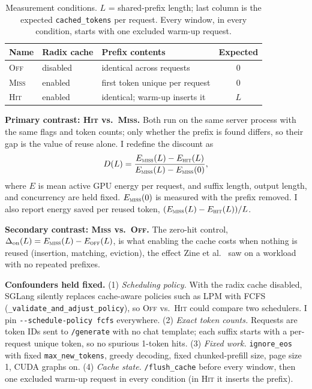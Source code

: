 \documentclass[conference]{IEEEtran}
\begin{document}
\begin{table}[!h]
\caption{Measurement conditions. $L$ = shared-prefix length; last column is the expected \texttt{cached\_tokens} per request. Every window, in every condition, starts with one excluded warm-up request.}
\label{tab:cond}
\centering
\footnotesize
\begin{tabular}{@{}lllc@{}}
\toprule
Name & Radix cache & Prefix contents & Expected \\
\midrule
\textsc{Off}  & disabled & identical across requests & 0 \\
\textsc{Miss} & enabled  & first token unique per request & 0 \\
\textsc{Hit}  & enabled  & identical; warm-up inserts it & $L$ \\
\bottomrule
\end{tabular}
\end{table}

\textbf{Primary contrast: \textsc{Hit} vs.\ \textsc{Miss}.} Both run on the same server process with the same flags and token counts; only whether the prefix is found differs, so their gap is the value of reuse alone. I redefine the discount as
\begin{equation}
D(L) = \frac{E_{\textsc{miss}}(L) - E_{\textsc{hit}}(L)}{E_{\textsc{miss}}(L) - E_{\textsc{miss}}(0)},
\label{eq:d}
\end{equation}
where $E$ is mean active GPU energy per request, and suffix length, output length, and concurrency are held fixed. $E_{\textsc{miss}}(0)$ is measured with the prefix removed. I also report energy saved per reused token, $(E_{\textsc{miss}}(L)-E_{\textsc{hit}}(L))/L$.

\textbf{Secondary contrast: \textsc{Miss} vs.\ \textsc{Off}.} The zero-hit control, $\Delta_{\text{on}}(L)=E_{\textsc{miss}}(L)-E_{\textsc{off}}(L)$, is what enabling the cache costs when nothing is reused (insertion, matching, eviction), the effect Zine et al.~\cite{zine} saw on a workload with no repeated prefixes.

\textbf{Confounders held fixed.} (1) \emph{Scheduling policy.} With the radix cache disabled, SGLang silently replaces cache-aware policies such as LPM with FCFS (\texttt{\_validate\_and\_adjust\_policy}), so \textsc{Off} vs.\ \textsc{Hit} could compare two schedulers. I pin \texttt{-{}-schedule-policy fcfs} everywhere. (2) \emph{Exact token counts.} Requests are token IDs sent to \texttt{/generate} with no chat template; each suffix starts with a per-request unique token, so no spurious 1-token hits. (3) \emph{Fixed work.} \texttt{ignore\_eos} with fixed \texttt{max\_new\_tokens}, greedy decoding, fixed chunked-prefill size, page size 1, CUDA graphs on. (4) \emph{Cache state.} \texttt{/flush\_cache} before every window, then one excluded warm-up request in every condition (in \textsc{Hit} it inserts the prefix).
\end{document}
